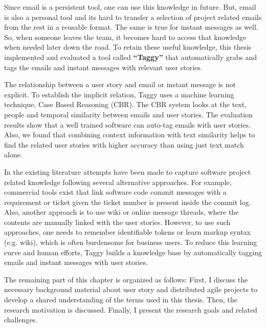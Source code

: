 Since email is a persistent tool, one can use this knowledge in future. But, email is also a personal tool and its hard to transfer a selection of project related emails from the rest in a reusable format. The same is true for instant messages as well. So, when someone leaves the team, it becomes hard to access that knowledge when needed later down the road. To retain these useful knowledge, this thesis implemented and evaluated a tool called \textbf{``Taggy''} that automatically grabs and tags the emails and instant messages with relevant user stories.

The relationship between a user story and email or instant message is not explicit. To establish the implicit relation, Taggy uses a machine learning technique, Case Based Reasoning (CBR). The CBR system looks at the text, people and temporal similarity between emails and user stories. The evaluation results show that a well trained software can auto-tag emails with user stories. Also, we found that combining context information with text similarity helps to find the related user stories with higher accuracy than using just text match alone.

In the existing literature attempts have been made to capture software project related knowledge following several alternative approaches. For example, commercial tools exist that link software code commit messages with a requirement or ticket given the ticket number is present inside the commit log. Also, another approach is to use wiki or online message threads, where the contents are manually linked with the user stories. However, to use such approaches, one needs to remember identifiable tokens or learn markup syntax (e.g. wiki), which is often burdensome for business users. To reduce this learning curve and human efforts, Taggy builds a knowledge base by automatically tagging emails and instant messages with user stories. 

The remaining part of this chapter is organized as follows: First, I discuss the necessary background material about user story and distributed agile projects to develop a shared understanding of the terms used in this thesis. Then, the research motivation is discussed. Finally, I present the research goals and related challenges.

